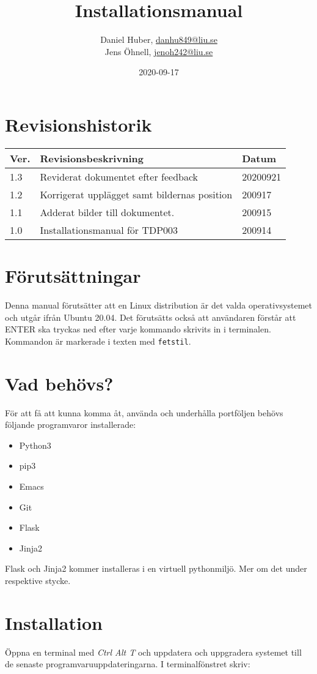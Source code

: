 \documentclass{TDP003mall}
\author{Daniel Huber, \url{danhu849@liu.se}\\
  Jens Öhnell, \url{jenoh242@liu.se}}
\title{Installationsmanual}
\date{2020-09-17}
\begin{document}
\projectpage
\section{Revisionshistorik}
\begin{table}[!h]
\begin{tabularx}{\linewidth}{|l|X|l|}
\hline
Ver. & Revisionsbeskrivning & Datum \\\hline
1.3 & Reviderat dokumentet efter feedback & 20200921 \\\hline
1.2 & Korrigerat upplägget samt bildernas position & 200917 \\\hline
1.1 & Adderat bilder till dokumentet. & 200915 \\\hline
1.0 & Installationsmanual för TDP003 & 200914 \\\hline
\end{tabularx}
\end{table}

\section{Förutsättningar}
Denna manual förutsätter att en Linux distribution är det valda operativsystemet och utgår ifrån Ubuntu 20.04. Det förutsätts också att användaren förstår att ENTER ska tryckas ned efter varje kommando skrivits in i terminalen. Kommandon är markerade i texten med \texttt{fetstil}.

\section{Vad behövs?}
För att få att kunna komma åt, använda och underhålla portföljen behövs följande programvaror installerade:
\begin{itemize}
  \item Python3
  \item pip3
  \item Emacs
  \item Git
  \item Flask
  \item Jinja2   
  \end{itemize}

Flask och Jinja2 kommer installeras i en virtuell pythonmiljö. Mer om det under respektive stycke.

\section{Installation}
Öppna en terminal med \emph{Ctrl Alt T} och uppdatera och uppgradera systemet till de senaste programvaruuppdateringarna. I terminalfönstret skriv:
\end{document}
